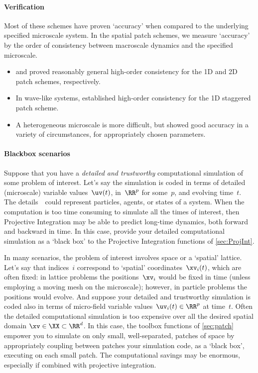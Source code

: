 \paragraph{Verification}
Most of these schemes have proven `accuracy' when compared to the underlying specified microscale system.
In the spatial patch schemes, we measure `accuracy' by the order of consistency between macroscale dynamics and the specified microscale.  
\begin{itemize}
\item \cite{Roberts06d} and \cite{Roberts2011a} proved reasonably general high-order consistency for the 1D and 2D patch schemes, respectively.
\item In wave-like systems, \cite{Cao2014a} established high-order consistency for the 1D staggered patch scheme.
\item A heterogeneous microscale is more difficult, but \cite{Bunder2013b} showed good accuracy in a variety of circumstances, for appropriately chosen parameters. 
\end{itemize}



\paragraph{Blackbox scenarios} 
Suppose that you have a \emph{detailed and trustworthy} computational simulation of some problem of interest.
Let's say the simulation is coded in terms of detailed (microscale) variable values~\(\uv(t)\), in~\(\RR^{p}\) for some~\(p\), and evolving time~\(t\).
The details~\uv\ could represent particles, agents, or states of a system.
When the computation is too time consuming to simulate all the times of interest, then Projective Integration may be able to predict long-time dynamics, both forward and backward in time.  
In this case, provide your detailed computational simulation as a `black box' to the Projective Integration functions of \cref{sec:ProjInt}.

In many scenarios, the problem of interest involves space or a `spatial' lattice.
Let's say that indices~\(i\) correspond to `spatial' coordinates~\(\xv_i(t)\), which are often fixed: in lattice problems the positions~\(\xv_i\) would be fixed in time (unless employing a moving mesh on the microscale); however, in particle problems the positions would evolve.
And suppose your detailed and trustworthy simulation is coded also in terms of micro-field variable values~\(\uv_i(t)\in\RR^p\) at time~\(t\).
Often the detailed computational simulation is too expensive over all the desired spatial domain \(\xv\in\XX\subset\RR^{d}\).
In this case, the toolbox functions of \cref{sec:patch} empower you to simulate on only small, well-separated, patches of space by appropriately coupling between patches your simulation code, as a `black box', executing on each small patch. 
The computational savings may be enormous, especially if combined with projective integration.



